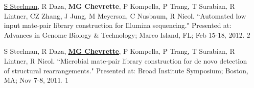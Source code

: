 \begin{cvpubs}
\cvpub
{\underline{S Steelman}, R Daza, \textbf{MG Chevrette}, P Kompella, P Trang, T Surabian, R Lintner, CZ Zhang, J Jung, M Meyerson, C Nusbaum, R Nicol. ``Automated low input mate-pair library construction for Illumina sequencing." Presented at: Advances in Genome Biology \& Technology; Marco Island, FL; Feb 15-18, 2012.}
{2}

\cvpub
{S Steelman, R Daza, \underline{\textbf{MG Chevrette}}, P Kompella, P Trang, T Surabian, R Lintner, R Nicol. ``Microbial mate-pair library construction for de novo detection of structural rearrangements." Presented at: Broad Institute Symposium; Boston, MA; Nov 7-8, 2011.}
{1}

\end{cvpubs}
